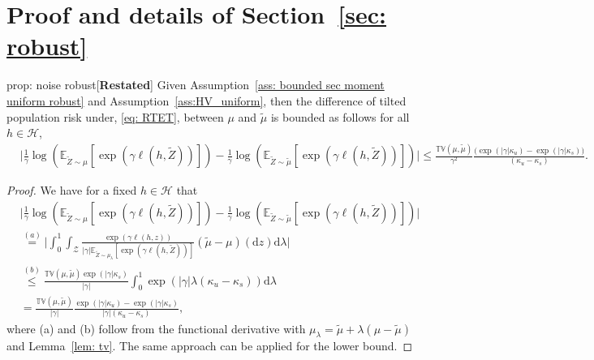 \documentclass{article}
\theoremstyle{plain}
\theoremstyle{plain}
\theoremstyle{definition}
\theoremstyle{remark}
\newcommand{\mrd}{\mathrm{d}}
\newcommand{\mbE}{\mathbb{E}}
\begin{document}
\section{Proof and details of Section~\ref{sec: robust}}\label{app: sec: robust}
\begin{repproposition}{prop: noise robust}[\textbf{Restated}]
  Given Assumption~\ref{ass: bounded sec moment uniform robust} and Assumption~\ref{ass:HV_uniform}, then the difference of tilted population risk under, \eqref{eq: RTET}, between $\mu$ and $\tilde{\mu}$ is bounded as follows for all $h\in\mathcal{H}$,
   \begin{equation}
    \begin{split}
        &\Big|\frac{1}{\gamma}\log(\mbE_{\tilde Z\sim\mu}[\exp(\gamma\ell(h,\tilde Z))])-\frac{1}{\gamma}\log(\mbE_{\tilde Z\sim\tilde{\mu}}[\exp(\gamma\ell(h,\tilde Z))])\Big|
        \leq \frac{\mathbb{TV}(\mu,\tilde{\mu})}{\gamma^2 }\frac{\Big(\exp(|\gamma|\kappa_u)-\exp(|\gamma|\kappa_s)\Big)}{(\kappa_u-\kappa_s)}.
        \end{split}
    \end{equation}
\end{repproposition}
\begin{proof}
We have for a fixed $h\in\mathcal{H}$ that 
    \begin{equation}
    \begin{split}
        &\Big|\frac{1}{\gamma}\log(\mbE_{\tilde Z\sim\mu}[\exp(\gamma\ell(h,\tilde Z))])-\frac{1}{\gamma}\log(\mbE_{\tilde Z\sim\tilde{\mu}}[\exp(\gamma\ell(h,\tilde Z))])\Big|
        \\&\overset{(a)}{=} \Big|\int_0^1\int_{\mathcal{Z}}\frac{\exp(\gamma \ell(h,z))}{|\gamma| \mbE_{\tilde Z\sim\mu_\lambda}[\exp(\gamma \ell(h,\tilde Z))]}(\tilde{\mu}-\mu)(\mrd z)\mrd\lambda\Big|
        \\
        &\overset{(b)}{\leq} \frac{\mathbb{TV}(\mu,\tilde{\mu})\exp(|\gamma|\kappa_s)}{|\gamma| }\int_{0}^1\exp(|\gamma|\lambda( \kappa_u-\kappa_s))\mrd\lambda\\
        &= \frac{\mathbb{TV}(\mu,\tilde{\mu})}{|\gamma| }\frac{\exp(|\gamma|\kappa_u)-\exp(|\gamma|\kappa_s)}{|\gamma|(\kappa_u-\kappa_s)},
        \end{split}
    \end{equation}
  where (a) and (b) follow from the functional derivative with $\mu_\lambda=\tilde\mu+\lambda(\mu-\tilde\mu)$ and Lemma~\ref{lem: tv}. The same approach can be applied for the lower bound.
\end{proof}
\end{document}

